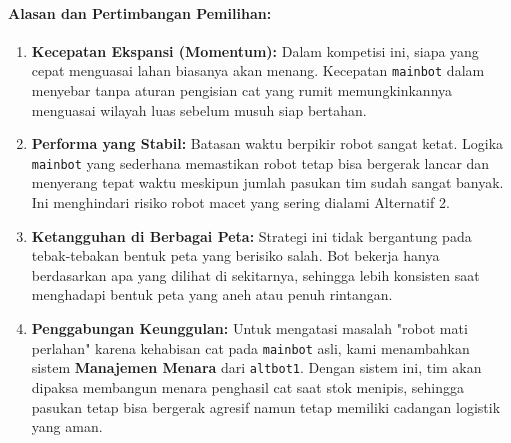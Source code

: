 \paragraph{Alasan dan Pertimbangan Pemilihan:}
\begin{enumerate}
    \item \textbf{Kecepatan Ekspansi (Momentum):} Dalam kompetisi ini, siapa yang cepat menguasai lahan biasanya akan menang. Kecepatan \texttt{mainbot} dalam menyebar tanpa aturan pengisian cat yang rumit memungkinkannya menguasai wilayah luas sebelum musuh siap bertahan.
    
    \item \textbf{Performa yang Stabil:} Batasan waktu berpikir robot sangat ketat. Logika \texttt{mainbot} yang sederhana memastikan robot tetap bisa bergerak lancar dan menyerang tepat waktu meskipun jumlah pasukan tim sudah sangat banyak. Ini menghindari risiko robot macet yang sering dialami Alternatif 2.
    
    \item \textbf{Ketangguhan di Berbagai Peta:} Strategi ini tidak bergantung pada tebak-tebakan bentuk peta yang berisiko salah. Bot bekerja hanya berdasarkan apa yang dilihat di sekitarnya, sehingga lebih konsisten saat menghadapi bentuk peta yang aneh atau penuh rintangan.
    
    \item \textbf{Penggabungan Keunggulan:} Untuk mengatasi masalah "robot mati perlahan" karena kehabisan cat pada \texttt{mainbot} asli, kami menambahkan sistem \textbf{Manajemen Menara} dari \texttt{altbot1}. Dengan sistem ini, tim akan dipaksa membangun menara penghasil cat saat stok menipis, sehingga pasukan tetap bisa bergerak agresif namun tetap memiliki cadangan logistik yang aman.
\end{enumerate}